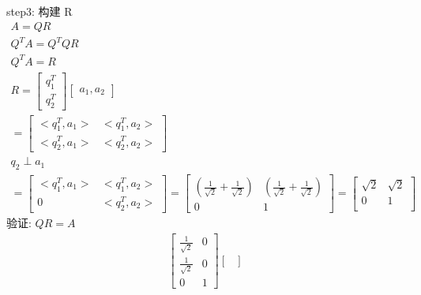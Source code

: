 \documentclass[12pt]{article}
\begin{document}
\begin{flushleft}
    step3: 构建 R \\
    \begin{align}
        A = QR                           \\
        Q^{T}A  = Q^{T}QR                \\
        Q^{T}A = R                       \\
        R  = \begin{bmatrix}
                 q_1^{T} \\
                 q_2^{T}
             \end{bmatrix}\begin{bmatrix}
                              a_1, a_2
                          \end{bmatrix} \\
        = \begin{bmatrix}
              <q_1^{T},a_1> & <q_1^{T},a_2> \\
              <q_2^{T},a_1> & <q_2^{T},a_2>
          \end{bmatrix}  \\
        q_2 \perp a_1                    \\
        = \begin{bmatrix}
              <q_1^{T},a_1> & <q_1^{T},a_2> \\
              0             & <q_2^{T},a_2>
          \end{bmatrix}
        = \begin{bmatrix}
              (\frac{1}{\sqrt{2}} + \frac{1}{\sqrt{2}}) & (\frac{1}{\sqrt{2}} + \frac{1}{\sqrt{2}}) \\
              0                                         & 1
          \end{bmatrix}
        = \begin{bmatrix}
              \sqrt{2} & \sqrt{2} \\
              0        & 1        \\
          \end{bmatrix}
    \end{align}
    验证: $QR = A$ \\
    \begin{align}
        \begin{bmatrix}
            \frac{1}{\sqrt{2}} & 0 \\
            \frac{1}{\sqrt{2}} & 0 \\
            0                  & 1
        \end{bmatrix} \begin{bmatrix}

\end{bmatrix}
\end{align}
\end{flushleft}
\end{document}
